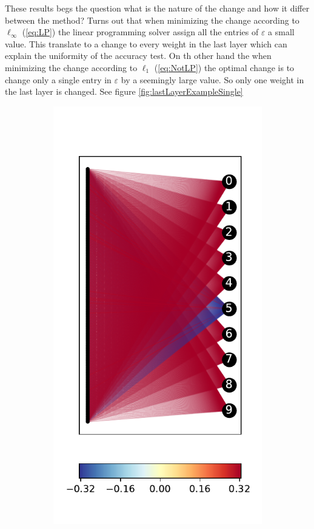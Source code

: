 \documentclass[a4paper]{easychair}
\begin{document}
These results begs the question what is the nature of the change and how it differ between the method? Turns out that when minimizing the change according to $\ell_\infty$ (\ref{eq:LP}) the linear programming solver assign all the entries of $\varepsilon$ a small value. This translate to a change to every weight in the last layer which can explain the uniformity of the accuracy test. On th other hand the when minimizing the change according to $\ell_1$ (\ref{eq:NotLP}) the optimal change is to change only a single entry in $\varepsilon$ by a seemingly large value. So only one weight in the last layer is changed. See figure \ref{fig:lastLayerExampleSingle}
\\
 
\begin{figure}
\centering
  \begin{subfigure}{0.4\linewidth}
  \includegraphics[width=\linewidth]{../data/results/problem3/last_layer_1_wm_example.pdf}

\end{subfigure}
\end{figure}
\end{document}
